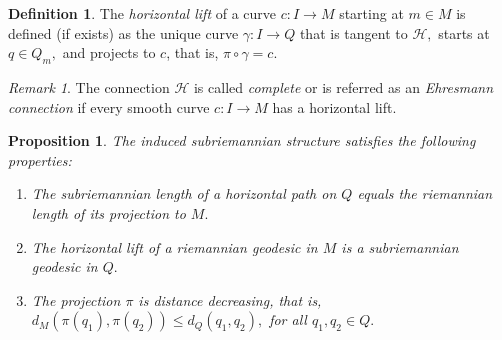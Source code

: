 \documentclass[12pt, letterpaper, reqno]{amsart}
\theoremstyle{definition}
\newtheorem{df}{Definition}
\theoremstyle{plain}
\newtheorem{prop}{Proposition}
\theoremstyle{remark}
\newtheorem{rem}{Remark}
\begin{document}
\begin{df}
	The \textit{horizontal lift} of a curve $ c: I \rightarrow {M} $ starting at $ m\in M $ is defined (if exists) as the unique curve $ \gamma : I \rightarrow {Q} $ that is tangent to $ \mathcal{H}, $ starts at $ q\in Q_m, $ and projects to $c$, that is, $ \pi\circ\gamma = c. $ 
\end{df}

\begin{rem}
	The connection $ \mathcal{H} $ is called \textit{complete} or is referred as an \textit{Ehresmann connection}  if every smooth curve $ c: I \rightarrow {M} $ has a horizontal lift.
\end{rem}

\begin{prop}
	The induced subriemannian structure satisfies the following properties:
	\begin{enumerate}
		\item The subriemannian length of a horizontal path on $ Q $ equals the riemannian length of its projection to $ M. $ 
		\item The horizontal lift of a riemannian geodesic in $ M $ is a subriemannian geodesic in $ Q. $ 
		\item The projection $ \pi $ is distance decreasing, that is, $ d_M(\pi(q_1), \pi(q_2))\leq d_Q(q_1,q_2), $ for all $ q_1,q_2\in Q. $ 
	\end{enumerate}
\end{prop}
\end{document}
